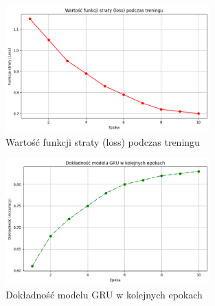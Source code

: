 \begin{figure}[h]
\centering
\includegraphics[width=0.7\textwidth]{loss_plot.png}
\caption{Wartość funkcji straty (loss) podczas treningu}
\end{figure}

\begin{figure}[h]
\centering
\includegraphics[width=0.7\textwidth]{accuracy_plot.png}
\caption{Dokładność modelu GRU w kolejnych epokach}
\end{figure}
